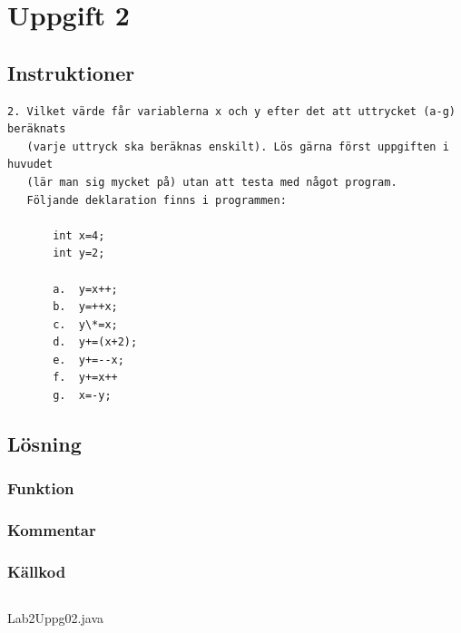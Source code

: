 \section{Uppgift 2}\label{sec:uppg02}

\subsection{Instruktioner}
\begin{verbatim}
2. Vilket värde får variablerna x och y efter det att uttrycket (a-g) beräknats
   (varje uttryck ska beräknas enskilt). Lös gärna först uppgiften i huvudet
   (lär man sig mycket på) utan att testa med något program.
   Följande deklaration finns i programmen:

       int x=4;
       int y=2;

       a.  y=x++;
       b.  y=++x;
       c.  y\*=x;
       d.  y+=(x+2);
       e.  y+=--x;
       f.  y+=x++
       g.  x=-y;
\end{verbatim}

\subsection{Lösning}
\subsubsection{Funktion}

\subsubsection{Kommentar}

%
%
%
%


\subsubsection{Källkod}
\inputminted[linenos]{java}{src/Lab2Uppg02.java}
\caption{Lab2Uppg02.java}
\label{src:uppg02}


